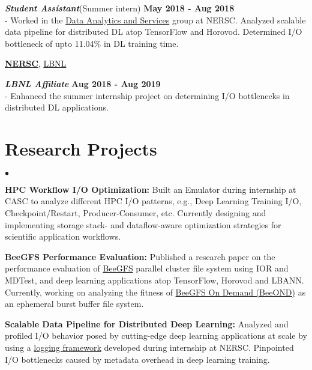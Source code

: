 \documentclass[margin,line]{res}
\newenvironment{list2}{
  \begin{list}{$\bullet$}{%
      \setlength{\itemsep}{0in}
      \setlength{\parsep}{0in} \setlength{\parskip}{0in}
      \setlength{\topsep}{0in} \setlength{\partopsep}{0in} 
      \setlength{\leftmargin}{0.2in}}}{\end{list}}
\begin{document}
\begin{resume}
\vspace{-.4cm}
\textbf{{\em Student Assistant}}(Summer intern) \hfill {\bf May 2018 - Aug 2018}\\
- Worked in the \href{http://www.nersc.gov/users/data-analytics/}{Data Analytics and Services} group at NERSC. Analyzed scalable data pipeline for distributed DL atop TensorFlow and Horovod. Determined I/O bottleneck of upto 11.04\% in DL training time.

\vspace{-.25cm}
{\bf \href{http://www.nersc.gov/}{NERSC}}, \href{http://www.lbl.gov/}{LBNL}

\vspace{-.4cm}
\textbf{{\em LBNL Affiliate}} \hfill {\bf Aug 2018 - Aug 2019}\\
- Enhanced the summer internship project on determining I/O bottlenecks in distributed DL applications.

\vspace*{-.05in}

\section{\sc Research Projects}
\begin{list2}
\item {\bf HPC Workflow I/O Optimization:} Built an Emulator during internship at CASC to analyze different HPC I/O patterns, e.g., Deep Learning Training I/O, Checkpoint/Restart, Producer-Consumer, etc. Currently designing and implementing storage stack- and dataflow-aware optimization strategies for scientific application workflows.
\vspace{.1cm}
\item {\bf BeeGFS Performance Evaluation:} Published a research paper on the performance evaluation of \href{https://www.beegfs.io/content/}{BeeGFS} parallel cluster file system using IOR and MDTest, and deep learning applications atop TensorFlow, Horovod and LBANN. Currently, working on analyzing the fitness of \href{http://www.beegfs.io/wiki/BeeOND}{BeeGFS On Demand (BeeOND)} as an ephemeral burst buffer file system.
\vspace{.1cm}
\item {\bf Scalable Data Pipeline for Distributed Deep Learning:} Analyzed and profiled I/O behavior posed by cutting-edge deep learning applications at scale by using a \href{https://github.com/NERSC/DL-Parallel-IO}{logging framework} developed during internship at NERSC. Pinpointed I/O bottlenecks caused by metadata overhead in deep learning training.
\end{list2}


\end{resume}
\end{document}
